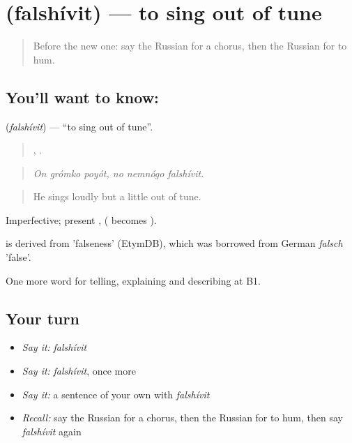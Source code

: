 \section[\texorpdfstring{\ru{фальшивить} (falshívit)}{фальшивить (falshívit)}]{ (falshívit) — to sing out of tune}

\label{lesson:RU-C516-falshivit}



\begin{quote}
Before the new one: say the Russian for a chorus, then the Russian for to hum.
\end{quote}

\subsection*{You'll want to know: }
\textbf{} (\emph{falshívit}) — \textquotedblleft{}to sing out of tune\textquotedblright{}.

\begin{quote}
  ,   .
\end{quote}

\begin{quote}
\emph{On grómko poyót, no nemnógo falshívit.}
\end{quote}

\begin{quote}
He sings loudly but a little out of tune.
\end{quote}

Imperfective; present ,  ( becomes ).

\begin{cousinweb}
\emph{} is derived from \emph{} 'falseness' (EtymDB), which was borrowed from German \emph{falsch} 'false'.
\end{cousinweb}

\begin{grammarlens}[title={What you've built}]
One more word for telling, explaining and describing at B1.
\end{grammarlens}

\subsection*{Your turn}
\begin{itemize}
\raggedright
  \item \emph{Say it:} \emph{falshívit}
  \item \emph{Say it:} \emph{falshívit}, once more
  \item \emph{Say it:} a sentence of your own with \emph{falshívit}
  \item \emph{Recall:} say the Russian for a chorus, then the Russian for to hum, then say \emph{falshívit} again
\end{itemize}

